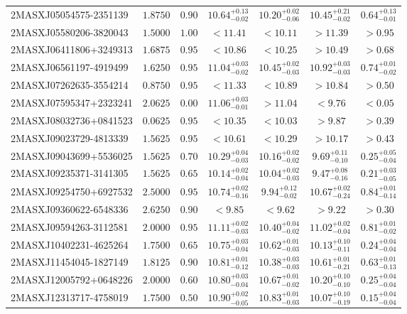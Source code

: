 \documentclass[onecolumn]{mn2e}
\begin{document}
{\begin{center}
\begin{longtable}{lcccccc}
2MASXJ05054575-2351139 & $1.8750$ & $0.90$ & $10.64_{-0.02}^{+0.13}$ & $10.20_{-0.06}^{+0.02}$ & $10.45_{-0.02}^{+0.21}$ &$0.64_{-0.01}^{+0.13}$ \\
2MASXJ05580206-3820043 & $1.5000$ & $1.00$ & $<11.41$ & $<10.11$ & $>11.39$ &$>0.95$ \\
2MASXJ06411806+3249313 & $1.6875$ & $0.95$ & $<10.86$ & $<10.25$ & $>10.49$ &$>0.68$ \\
2MASXJ06561197-4919499 & $1.6250$ & $0.95$ & $11.04_{-0.02}^{+0.03}$ & $10.45_{-0.03}^{+0.02}$ & $10.92_{-0.03}^{+0.03}$ &$0.74_{-0.02}^{+0.01}$ \\
2MASXJ07262635-3554214 & $0.8750$ & $0.95$ & $<11.33$ & $<10.89$ & $>10.84$ &$>0.50$ \\
2MASXJ07595347+2323241 & $2.0625$ & $0.00$ & $11.06_{-0.01}^{+0.03}$ & $>11.04$ & $<9.76$ &$<0.05$ \\
2MASXJ08032736+0841523 & $0.0625$ & $0.95$ & $<10.35$ & $<10.03$ & $>9.87$ &$>0.39$ \\
2MASXJ09023729-4813339 & $1.5625$ & $0.95$ & $<10.61$ & $<10.29$ & $>10.17$ &$>0.43$ \\
2MASXJ09043699+5536025 & $1.5625$ & $0.70$ & $10.29_{-0.03}^{+0.04}$ & $10.16_{-0.02}^{+0.02}$ & $9.69_{-0.10}^{+0.11}$ &$0.25_{-0.04}^{+0.05}$ \\
2MASXJ09235371-3141305 & $1.5625$ & $0.65$ & $10.14_{-0.04}^{+0.02}$ & $10.04_{-0.03}^{+0.02}$ & $9.47_{-0.16}^{+0.08}$ &$0.21_{-0.05}^{+0.03}$ \\
2MASXJ09254750+6927532 & $2.5000$ & $0.95$ & $10.74_{-0.16}^{+0.02}$ & $9.94_{-0.02}^{+0.12}$ & $10.67_{-0.24}^{+0.02}$ &$0.84_{-0.14}^{+0.01}$ \\
2MASXJ09360622-6548336 & $2.6250$ & $0.90$ & $<9.85$ & $<9.62$ & $>9.22$ &$>0.30$ \\
2MASXJ09594263-3112581 & $2.0000$ & $0.95$ & $11.11_{-0.03}^{+0.02}$ & $10.40_{-0.02}^{+0.04}$ & $11.02_{-0.04}^{+0.02}$ &$0.81_{-0.02}^{+0.01}$ \\
2MASXJ10402231-4625264 & $1.7500$ & $0.65$ & $10.75_{-0.04}^{+0.03}$ & $10.62_{-0.03}^{+0.01}$ & $10.13_{-0.11}^{+0.10}$ &$0.24_{-0.04}^{+0.04}$ \\
2MASXJ11454045-1827149 & $1.8125$ & $0.90$ & $10.81_{-0.12}^{+0.01}$ & $10.38_{-0.03}^{+0.03}$ & $10.61_{-0.21}^{+0.01}$ &$0.63_{-0.13}^{+0.01}$ \\
2MASXJ12005792+0648226 & $2.0000$ & $0.60$ & $10.80_{-0.04}^{+0.03}$ & $10.67_{-0.02}^{+0.01}$ & $10.20_{-0.10}^{+0.10}$ &$0.25_{-0.04}^{+0.04}$ \\
2MASXJ12313717-4758019 & $1.7500$ & $0.50$ & $10.90_{-0.05}^{+0.02}$ & $10.83_{-0.03}^{+0.01}$ & $10.07_{-0.19}^{+0.10}$ &$0.15_{-0.04}^{+0.04}$ \\

\end{longtable}
\end{center}}
\end{document}
